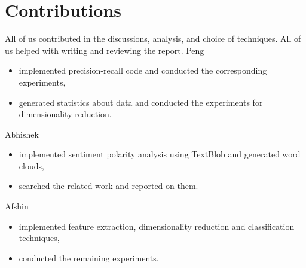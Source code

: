 \section{Contributions}
\label{contributions}
All of us contributed in the discussions, analysis, and choice of techniques.
All of us helped with writing and reviewing the report.
Peng 
\begin{itemize}
	\item implemented precision-recall code and conducted the corresponding experiments,
	\item generated statistics about data and conducted the experiments for dimensionality reduction.
\end{itemize}
Abhishek
\begin{itemize}
	\item implemented sentiment polarity analysis using TextBlob and generated word clouds,
	\item searched the related work and reported on them.		
\end{itemize}
Afshin
\begin{itemize}
	\item implemented feature extraction, dimensionality reduction and classification techniques,
	\item conducted the remaining experiments.
\end{itemize}